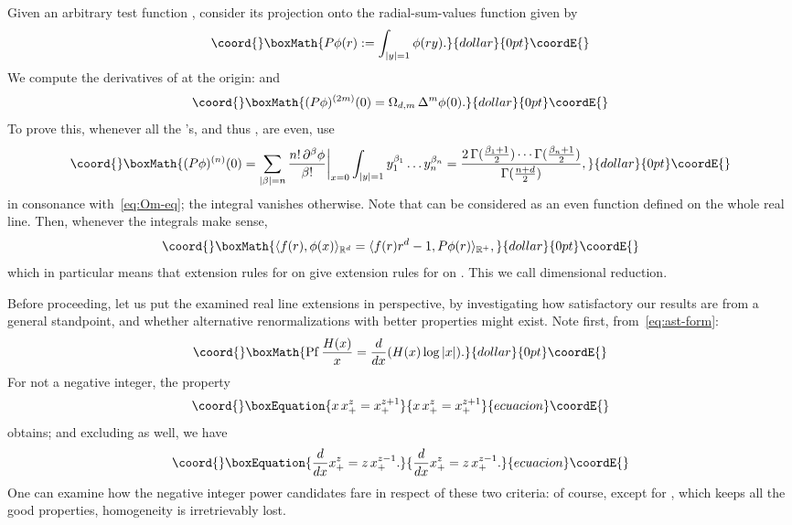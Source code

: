\documentclass[a4paper,12pt]{article}
\renewcommand{\b}{\beta}           %
\providecommand{\Dl}{\Delta}           %
\providecommand{\del}{\partial}        %
\providecommand{\Ga}{\Gamma}           %
\DeclareMathOperator{\Pf}{Pf}      %
\providecommand{\R}{\mathbb{R}}        %
\providecommand{\7}{\dagger}           %
\def\<#1,#2>{\langle#1,#2\rangle}  %
\theoremstyle{plain}
\theoremstyle{definition}
\begin{document}
Given an arbitrary test function \myHighlight{$\phi$}\coordHE{}, consider its projection onto
the radial-sum-values function \coordHE{} given by
$$\coord{}\boxMath{
P\phi(r) := \int_{|y|=1} \phi(ry).
}{dollar}{0pt}\coordE{}$$
We compute the derivatives of \coordHE{} at the origin:
\coordHE{} and
$$\coord{}\boxMath{
(P\phi)^{(2m)}(0) = \Omega_{d,m}\,\Dl^m\phi(0).
}{dollar}{0pt}\coordE{}$$
To prove this, whenever all the \myHighlight{$\b$}\coordHE{}'s, and thus \coordHE{}, are even, use
$$\coord{}\boxMath{
(P\phi)^{(n)}(0) =
\sum_{|\b|=n} \frac{n!\,\del^\b\phi}{\b!} \biggr|_{x=0}
\int_{|y|=1} y_1^{\b_1} \dots y_n^{\b_n} =
\frac{2\,\Ga(\frac{\b_1+1}{2})\cdots\Ga(\frac{\b_n+1}{2})}
      {\Ga(\frac{n+d}{2})},
}{dollar}{0pt}\coordE{}$$
in consonance with~\eqref{eq:Om-eq}; the integral vanishes otherwise.
Note that \coordHE{} can be considered as an even function defined on the
whole real line. Then, whenever the integrals make sense,
$$\coord{}\boxMath{
\<f(r), \phi(x)>_{\R^d} = \<f(r) r^{d-1}, P\phi(r)>_{\R^+},
}{dollar}{0pt}\coordE{}$$
which in particular means that extension rules for \coordHE{} on \myHighlight{$\R$}\coordHE{}
give extension rules for \coordHE{} on \myHighlight{$\R^d$}\coordHE{}. This we call
dimensional reduction.

Before proceeding, let us put the examined real line extensions in
perspective, by investigating how satisfactory our results are from a
general standpoint, and whether alternative renormalizations with
better properties might exist. Note first, from~\eqref{eq:ast-form}:
$$\coord{}\boxMath{
\Pf \frac{H(x)}{x} = \frac{d}{dx} (H(x) \log|x|).
}{dollar}{0pt}\coordE{}$$
For \coordHE{} not a negative integer, the property
\begin{equation}\coord{}\boxEquation{
x\,x_+^z = x_+^{z+1}
\label{eq:req-one}
}{
x\,x_+^z = x_+^{z+1}
}{ecuacion}\coordE{}\end{equation}
obtains; and excluding \coordHE{} as well, we have
\begin{equation}\coord{}\boxEquation{
\frac{d}{dx} x_+^z = z\,x_+^{z-1}.
\label{eq:req-two}
}{
\frac{d}{dx} x_+^z = z\,x_+^{z-1}.
}{ecuacion}\coordE{}\end{equation}
One can examine how the negative integer power candidates fare in
respect of these two criteria: of course, except for \coordHE{}, which
keeps all the good properties, homogeneity is irretrievably lost.
\end{document}
